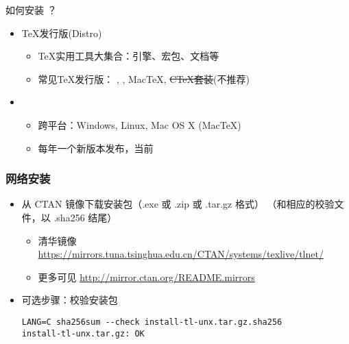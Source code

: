 \begin{frame}{如何安装 ？}
  \begin{itemize}
    \item \TeX{}发行版(Distro)
      \begin{itemize}
        \item \TeX{}实用工具大集合：引擎、宏包、文档等
        \item 常见\TeX{}发行版：
          \alert{\TL}, , Mac\TeX, \sout{C\TeX 套装}(不推荐)
      \end{itemize}
    \item \TL
      \begin{itemize}
        \item 跨平台：Windows, Linux, Mac OS X (Mac\TeX)
        \item 每年一个新版本发布，当前 
      \end{itemize}
  \end{itemize}
\end{frame}

\begin{frame}[fragile]
  \frametitle{网络安装}
  \begin{itemize}
    \item 从 CTAN 镜像下载安装包（.exe 或 .zip 或 .tar.gz 格式）
      （和相应的校验文件，以 .sha256 结尾）
      \begin{itemize} %
        \item 清华镜像 \url{https://mirrors.tuna.tsinghua.edu.cn/CTAN/systems/texlive/tlnet/}
        \item 更多可见 \url{http://mirror.ctan.org/README.mirrors}
      \end{itemize}

    \item 可选步骤：校验安装包
      \begin{verbatim}
LANG=C sha256sum --check install-tl-unx.tar.gz.sha256
install-tl-unx.tar.gz: OK
      \end{verbatim}

  \end{itemize}
\end{frame}

